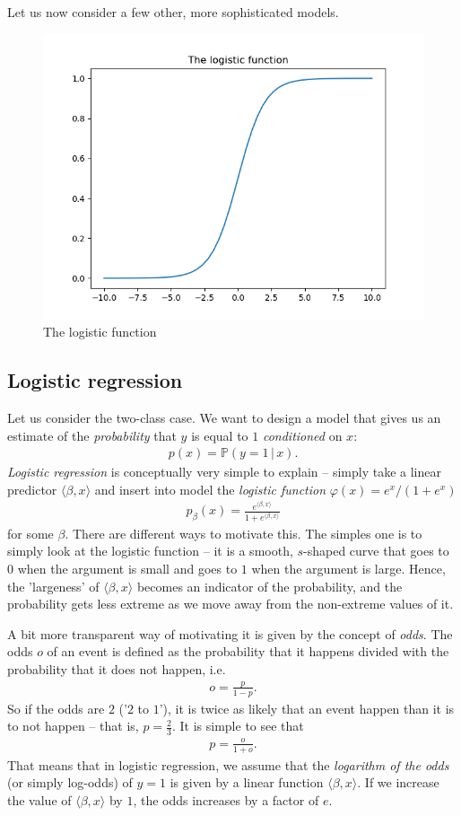 \documentclass{article}
\newcommand{\sprod}[1]{\langle #1 \rangle}
\begin{document}
Let us now consider a few other, more sophisticated models.

\begin{figure}
    \centering
    \includegraphics[width=0.5\linewidth]{graphics/logistic.png}
    \caption{The logistic function}
\end{figure}

\subsection{Logistic regression} Let us consider the two-class case. We want to design a model that gives us an estimate of the \emph{probability} that $y$ is equal to $1$ \emph{conditioned} on $x$:
\begin{align*}
    p(x) = \mathbb{P}(y=1 \, \vert \, x).
\end{align*}
\emph{Logistic regression} is conceptually very simple to explain -- simply take a linear predictor $\sprod{\beta,x}$ and insert into  model the \emph{logistic function} $\varphi(x)=e^x/(1+e^x)$
\begin{align*}
    p_\beta(x) = \frac{e^{\sprod{\beta,x}}}{1+e^{\sprod{\beta,x}}}
\end{align*}
for some $\beta$. There are different ways to motivate this. The simples one is to simply look at the logistic function -- it is a smooth, $s$-shaped curve that goes to $0$ when the argument is small and goes to $1$ when the argument is  large. Hence, the 'largeness' of $\sprod{\beta,x}$ becomes an indicator of the probability, and the probability gets less extreme as we move away from the non-extreme values of it.

A bit more transparent way of motivating it is given by the concept of \emph{odds}. The odds $o$ of an event is defined as the probability that it happens divided with the probability that it does not happen, i.e.
\begin{align*}
    o = \frac{p}{1-p}.
\end{align*}
So if the odds are $2$ ('$2$ to $1$'), it is twice as likely that an event happen than it is to not happen -- that is, $p=\tfrac{2}{3}$. It is simple to see that 
\begin{align*}
    p = \frac{o}{1+o}.
\end{align*}
That means that in logistic regression, we assume that the \emph{logarithm of the odds} (or simply log-odds) of $y=1$ is given by a linear function $\sprod{\beta,x}$. If we increase the value of $\sprod{\beta,x}$ by $1$, the odds increases by a factor of $e$.
\end{document}
